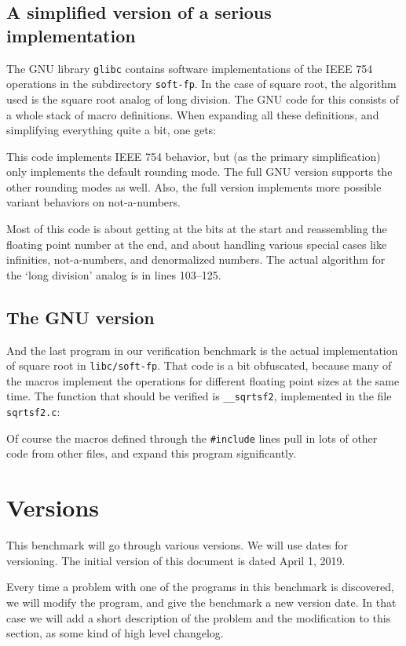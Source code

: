 \documentclass{article}
\begin{document}
\subsection{A simplified version of a serious implementation}
The GNU library \texttt{glibc} contains software implementations of
the IEEE 754 operations in the subdirectory \texttt{soft-fp}.
In the case of square root, the algorithm used is the square root
analog of long division.
The GNU code for this consists of a whole stack of macro definitions.
When expanding all these definitions, and simplifying everything quite a bit, one gets:

This code implements IEEE 754 behavior, but (as the primary simplification)
only implements the default rounding mode.
The full GNU version supports the other rounding modes as well.
Also, the full version implements more possible variant behaviors on not-a-numbers.

Most of this code is about getting at the bits at the start and reassembling the
floating point number at the end, and about
handling various special cases like infinities, not-a-numbers, and
denormalized numbers.
The actual algorithm for the `long division' analog
is in lines 103--125.

\subsection{The GNU version}
And the last program in our verification benchmark is the actual implementation
of square root in \texttt{libc/soft-fp}.
That code is a bit obfuscated, because many of the macros implement the operations
for different floating point sizes at the same time.
The function that should be verified is \lstinline|__sqrtsf2|,
implemented in the file \lstinline|sqrtsf2.c|:

Of course the macros defined through the \lstinline|#include| lines pull in lots of other code from other files, and expand this program significantly.

\section{Versions}

This benchmark will go through various versions.
We will use dates for versioning.
The initial version of this document is dated April 1, 2019.

Every time a problem with one of the programs in this
benchmark is discovered, we will modify the program, and give
the benchmark a new version date.
In that case we will add a short description of the problem and the modification to
this section, as some kind of high level changelog.
\end{document}

